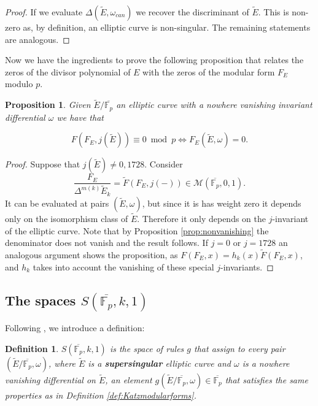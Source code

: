 \documentclass[13pt]{amsart}
\newtheorem{proposition}[theorem]{Proposition}
\newtheorem{definition}[theorem]{Definition}
\theoremstyle{remark}
\numberwithin{theorem}{section} \numberwithin{equation}{section}
\begin{document}
\begin{proof}
 If we evaluate $\Delta(\tilde{E}, \omega_{can})$ we recover the discriminant of 
$\tilde{E}$. This is non-zero as, by definition, an elliptic curve is 
non-singular. The remaining statements are analogous.
\end{proof}

Now we have the ingredients to prove the following proposition that relates the zeros of the divisor polynomial of $E$ with the zeros of the modular form $F_E$
modulo $p$.

\begin{proposition} \label{prop:zerosmodp}
 Given $\tilde{E}/\overline{\mathbb{F}_p}$ an elliptic curve with a nowhere vanishing invariant differential $\omega$ we have that
 
 \[ F(F_{E},j(\tilde{E})) \equiv 0 \bmod{p}  \iff F_{E}( \tilde{E}, \omega)= 0  .\]
 
 
\end{proposition}

\begin{proof}
Suppose that $j(\tilde{E}) \not= 0,1728$. Consider  
\[ \frac{F_E}{\Delta^{m(k)} 
\tilde{E}_{k}}= \tilde{F}(F_{E},j(-)) \in 
\mathcal{M}(\overline{\mathbb{F}_p},0,1).  \]
It can be evaluated at pairs $( \tilde{E}, \omega)$, but since
 it is has weight zero it depends only on the isomorphism class of $\tilde{E}$. Therefore it only depends on the $j$-invariant of the elliptic curve. Note that
by Proposition \ref{prop:nonvanishing} the denominator does not vanish and the result follows. If $j=0$ or $j=1728$ an analogous argument shows the proposition, as
$F(F_{E},x)=h_{k}(x)\tilde{F}(F_{E},x)$, and $h_{k}$ takes into account the vanishing of these special $j$-invariants.
 
\end{proof}

\subsection{The spaces $S(\overline{\mathbb{F}_p},k,1)$ }

Following \cite{Serre2}, we introduce a definition:

\begin{definition} \label{def:supersingular}
 ${S}(\overline{\mathbb{F}_p},k,1)$ is the space of rules $g$ that assign to every 
pair $(\tilde{E}/\overline{\mathbb{F}_p}, \omega)$, where $\tilde{E}$ is a 
\textbf{supersingular} elliptic
curve and $\omega$ is a nowhere vanishing differential on $\tilde{E}$, an 
element $g(\tilde{E}/\overline{\mathbb{F}_p},\omega) \in \overline{\mathbb{F}_p}$
that satisfies the same properties as in Definition \ref{def:Katzmodularforms}.

\end{definition}
\end{document}
